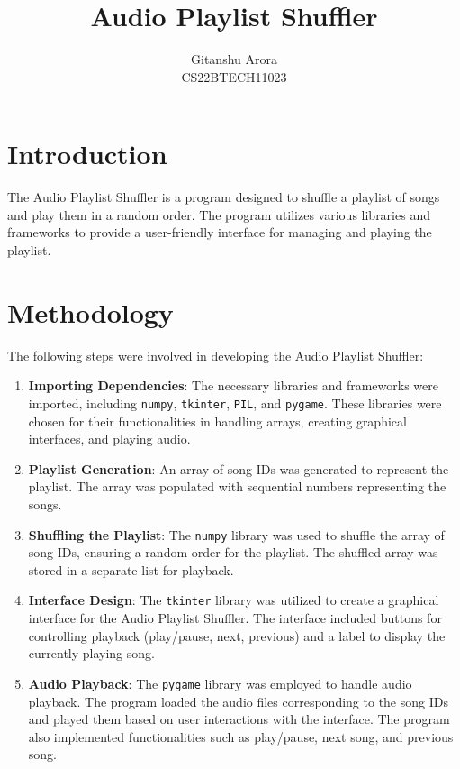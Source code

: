 \documentclass{article}
\title{Audio Playlist Shuffler}
\author{Gitanshu Arora\\CS22BTECH11023}
\begin{document}
\maketitle

\section{Introduction}
The Audio Playlist Shuffler is a program designed to shuffle a playlist of songs and play them in a random order. The program utilizes various libraries and frameworks to provide a user-friendly interface for managing and playing the playlist.

\section{Methodology}
The following steps were involved in developing the Audio Playlist Shuffler:

\begin{enumerate}
    \item \textbf{Importing Dependencies}: The necessary libraries and frameworks were imported, including \texttt{numpy}, \texttt{tkinter}, \texttt{PIL}, and \texttt{pygame}. These libraries were chosen for their functionalities in handling arrays, creating graphical interfaces, and playing audio.
    
    \item \textbf{Playlist Generation}: An array of song IDs was generated to represent the playlist. The array was populated with sequential numbers representing the songs.
    
    \item \textbf{Shuffling the Playlist}: The \texttt{numpy} library was used to shuffle the array of song IDs, ensuring a random order for the playlist. The shuffled array was stored in a separate list for playback.
    
    \item \textbf{Interface Design}: The \texttt{tkinter} library was utilized to create a graphical interface for the Audio Playlist Shuffler. The interface included buttons for controlling playback (play/pause, next, previous) and a label to display the currently playing song.
    
    \item \textbf{Audio Playback}: The \texttt{pygame} library was employed to handle audio playback. The program loaded the audio files corresponding to the song IDs and played them based on user interactions with the interface. The program also implemented functionalities such as play/pause, next song, and previous song.
\end{enumerate}
\end{document}
